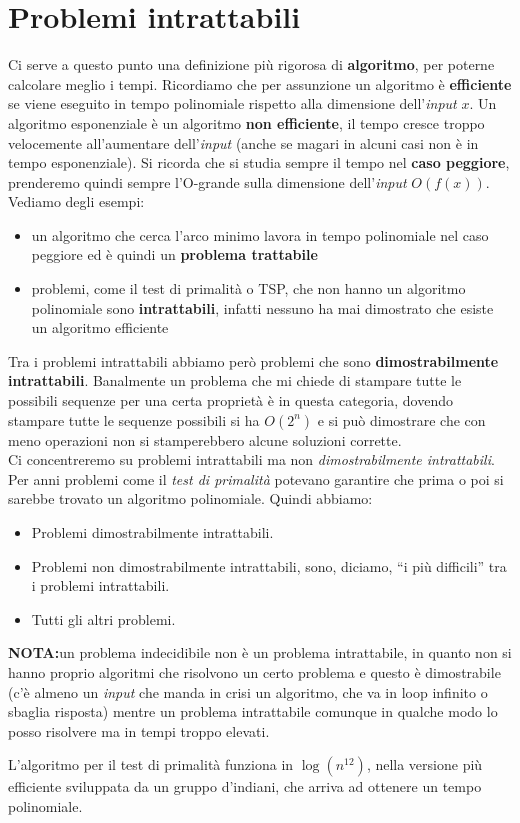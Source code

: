 \section{Problemi intrattabili}
Ci serve a questo punto una definizione più rigorosa di \textbf{algoritmo}, per
poterne calcolare meglio i tempi. Ricordiamo che per assunzione un algoritmo è
\textbf{efficiente} se viene eseguito in tempo polinomiale rispetto alla dimensione
dell'\textit{input} $x$. Un algoritmo esponenziale è un
algoritmo \textbf{non efficiente}, il tempo cresce troppo velocemente
all'aumentare dell'\textit{input} (anche se magari in alcuni casi non è in tempo
esponenziale). Si ricorda che si studia sempre il tempo nel 
\textbf{caso peggiore}, prenderemo quindi sempre l'O-grande sulla dimensione
dell'\textit{input} $O(f(x))$.\\
Vediamo degli esempi:
\begin{itemize}
  \item un algoritmo che cerca l'arco minimo lavora in tempo polinomiale nel
  caso peggiore ed è quindi un \textbf{problema trattabile}
  \item problemi, come il test di primalità o TSP, che non hanno un algoritmo
  polinomiale sono \textbf{intrattabili}, infatti nessuno ha mai dimostrato che
  esiste un algoritmo efficiente
\end{itemize}
Tra i problemi intrattabili abbiamo però problemi che sono
\textbf{dimostrabilmente intrattabili}. Banalmente un problema che mi chiede di
stampare tutte le possibili sequenze per una certa proprietà è in questa
categoria, dovendo stampare tutte le sequenze possibili si ha $O(2^n)$ e si può
dimostrare che con meno operazioni non si stamperebbero alcune soluzioni
corrette.\\
Ci concentreremo su problemi intrattabili ma non \textit{dimostrabilmente
  intrattabili}.\\
Per anni problemi come il \textit{test di primalità} potevano garantire che
prima o poi si sarebbe trovato un algoritmo polinomiale. Quindi abbiamo:
\begin{itemize}
  \item Problemi dimostrabilmente intrattabili.
  \item Problemi non dimostrabilmente intrattabili, sono, diciamo, ``i più
  difficili'' tra i problemi intrattabili.
  \item Tutti gli altri problemi.
\end{itemize}
\textbf{NOTA:}un problema indecidibile non è un problema intrattabile, in quanto non
si hanno proprio algoritmi che risolvono un certo problema e questo è
dimostrabile (c'è almeno un \textit{input} che manda in crisi un algoritmo, che va in
loop infinito o sbaglia risposta) mentre un problema intrattabile comunque in
qualche modo lo posso risolvere ma in tempi troppo elevati.
\begin{shaded}
  L'algoritmo per il test di primalità funziona in $\log (n^{12})$, nella
  versione più efficiente sviluppata da un gruppo d'indiani, che arriva ad
  ottenere un tempo polinomiale.
\end{shaded}
